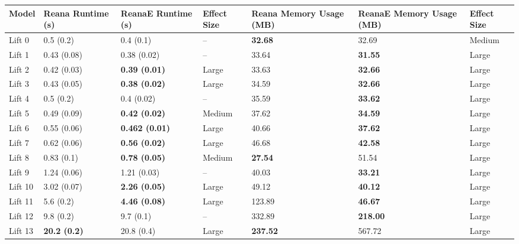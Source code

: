 \begin{tabular}{lllllll}
\toprule
  Model &    Reana Runtime (s) &    ReanaE Runtime (s) & Effect Size & Reana Memory Usage (MB) & ReanaE Memory Usage (MB) & Effect Size \\
\midrule
 Lift 0 &            0.5 (0.2) &             0.4 (0.1) &          -- &          \textbf{32.68} &                    32.69 &      Medium \\
 Lift 1 &          0.43 (0.08) &           0.38 (0.02) &          -- &                   33.64 &           \textbf{31.55} &       Large \\
 Lift 2 &          0.42 (0.03) &  \textbf{0.39 (0.01)} &       Large &                   33.63 &           \textbf{32.66} &       Large \\
 Lift 3 &          0.43 (0.05) &  \textbf{0.38 (0.02)} &       Large &                   34.59 &           \textbf{32.66} &       Large \\
 Lift 4 &            0.5 (0.2) &            0.4 (0.02) &          -- &                   35.59 &           \textbf{33.62} &       Large \\
 Lift 5 &          0.49 (0.09) &  \textbf{0.42 (0.02)} &      Medium &                   37.62 &           \textbf{34.59} &       Large \\
 Lift 6 &          0.55 (0.06) & \textbf{0.462 (0.01)} &       Large &                   40.66 &           \textbf{37.62} &       Large \\
 Lift 7 &          0.62 (0.06) &  \textbf{0.56 (0.02)} &       Large &                   46.68 &           \textbf{42.58} &       Large \\
 Lift 8 &           0.83 (0.1) &  \textbf{0.78 (0.05)} &      Medium &          \textbf{27.54} &                    51.54 &       Large \\
 Lift 9 &          1.24 (0.06) &           1.21 (0.03) &          -- &                   40.03 &           \textbf{33.21} &       Large \\
Lift 10 &          3.02 (0.07) &  \textbf{2.26 (0.05)} &       Large &                   49.12 &           \textbf{40.12} &       Large \\
Lift 11 &            5.6 (0.2) &  \textbf{4.46 (0.08)} &       Large &                  123.89 &           \textbf{46.67} &       Large \\
Lift 12 &            9.8 (0.2) &             9.7 (0.1) &          -- &                  332.89 &          \textbf{218.00} &       Large \\
Lift 13 &  \textbf{20.2 (0.2)} &            20.8 (0.4) &       Large &         \textbf{237.52} &                   567.72 &       Large \\

\end{tabular}
